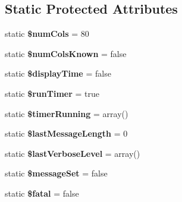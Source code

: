 \subsection*{\-Static \-Protected \-Attributes}
\begin{DoxyCompactItemize}
\item 
\hypertarget{class_tools_1_1_log_c_l_i_a89db15d289eaa2ea860418f82c8ba368}{
static {\bfseries \$num\-Cols} = 80}
\label{class_tools_1_1_log_c_l_i_a89db15d289eaa2ea860418f82c8ba368}

\item 
\hypertarget{class_tools_1_1_log_c_l_i_a410ab1458958c7a325f7d7127dc24300}{
static {\bfseries \$num\-Cols\-Known} = false}
\label{class_tools_1_1_log_c_l_i_a410ab1458958c7a325f7d7127dc24300}

\item 
\hypertarget{class_tools_1_1_log_c_l_i_ab2b961009fd0e2df3717fefb2787ec2d}{
static {\bfseries \$display\-Time} = false}
\label{class_tools_1_1_log_c_l_i_ab2b961009fd0e2df3717fefb2787ec2d}

\item 
\hypertarget{class_tools_1_1_log_c_l_i_a546171deab90f0c7aaebc911b2282813}{
static {\bfseries \$run\-Timer} = true}
\label{class_tools_1_1_log_c_l_i_a546171deab90f0c7aaebc911b2282813}

\item 
\hypertarget{class_tools_1_1_log_c_l_i_a16fd5a3c3ea79175dd70d8890938104e}{
static {\bfseries \$timer\-Running} = array()}
\label{class_tools_1_1_log_c_l_i_a16fd5a3c3ea79175dd70d8890938104e}

\item 
\hypertarget{class_tools_1_1_log_c_l_i_ab7093093281a03ccd56dd000d635ad44}{
static {\bfseries \$last\-Message\-Length} = 0}
\label{class_tools_1_1_log_c_l_i_ab7093093281a03ccd56dd000d635ad44}

\item 
\hypertarget{class_tools_1_1_log_c_l_i_a37d6409dfdb2bb8e33b490f9e6d195ce}{
static {\bfseries \$last\-Verbose\-Level} = array()}
\label{class_tools_1_1_log_c_l_i_a37d6409dfdb2bb8e33b490f9e6d195ce}

\item 
\hypertarget{class_tools_1_1_log_c_l_i_aafa0f710b9b1d3bc882b275ccdbb521e}{
static {\bfseries \$message\-Set} = false}
\label{class_tools_1_1_log_c_l_i_aafa0f710b9b1d3bc882b275ccdbb521e}

\item 
\hypertarget{class_tools_1_1_log_c_l_i_a5d0e306820fbd8e1ef86c2115a3151c0}{
static {\bfseries \$fatal} = false}
\label{class_tools_1_1_log_c_l_i_a5d0e306820fbd8e1ef86c2115a3151c0}


\end{DoxyCompactItemize}
